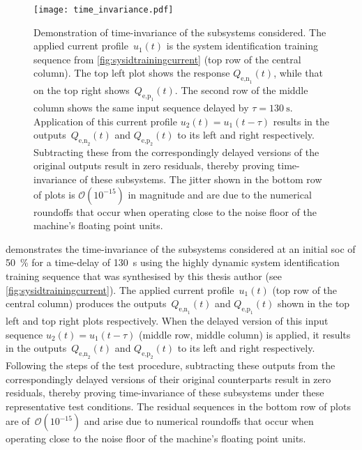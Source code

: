 \begin{figure}[!htbp]
    \centering
    \texttt{[image: time\_invariance.pdf]}
    \caption[Demonstration of time-invariance of~$Q_\text{e,n}(t)$ and
    $Q_\text{e,p}(t)$ subsystems]{Demonstration of time-invariance of the
        subsystems considered. The applied current profile~$u_1(t)$ is the
        system identification training sequence
        from \cref{fig:sysidtrainingcurrent} (top row of the central column).
        The top left plot shows the response $Q_{\text{e,n}_1}\!(t)$, while that
        on the top right shows~$Q_{\text{e,p}_1}\!(t)$. The second row of the
        middle column shows the same input sequence delayed by ${\tau =
        \SI{130}{\second}}$. Application of this current profile $u_2(t) =
        u_1(t-\tau)$ results in the outputs~$Q_{\text{e,n}_2}\!(t)$ and
        $Q_{\text{e,p}_2}\!(t)$ to its left and right respectively. Subtracting
        these from the correspondingly delayed versions of the original outputs
        result in zero residuals, thereby proving time-invariance of these
        subsystems. The jitter shown in the bottom row of plots is
        $\mathcal{O}(10^{-15})$ in magnitude and are due to the numerical
        roundoffs that occur when operating close to the noise floor of the
    machine's floating point units.}%
\label{fig:timeinvariance}
\end{figure}

  demonstrates the  time-invariance  of the  subsystems
considered  at  an  initial  \gls{soc} of  \SI{50}{\percent}  for  a  time-delay
of   \SI{130}{\second}   using   the  highly   dynamic   system   identification
training    sequence   that    was   synthesised    by   this    thesis   author
(see \cref{fig:sysidtrainingcurrent}).  The  applied  current  profile~$u_1(t)$
(top row  of the  central column)  produces the  outputs~$Q_{\text{e,n}_1}\!(t)$
and  $Q_{\text{e,p}_1}\!(t)$  shown  in  the   top  left  and  top  right  plots
respectively.  When  the delayed  version  of  this  input sequence  ${u_2(t)  =
u_1(t-\tau)}$ (middle row, middle column) is  applied, it results in the outputs~$Q_{\text{e,n}_2}\!(t)$  and  $Q_{\text{e,p}_2}\!(t)$  to  its  left  and  right
respectively.  Following the  steps  of the  test  procedure, subtracting  these
outputs from the correspondingly delayed versions of their original counterparts
result in  zero residuals, thereby  proving time-invariance of  these subsystems
under these representative test conditions. The residual sequences in the bottom
row of plots are of~$\mathcal{O}(10^{-15})$ and arise due to numerical roundoffs
that occur  when operating close  to the noise  floor of the  machine's floating
point units.

